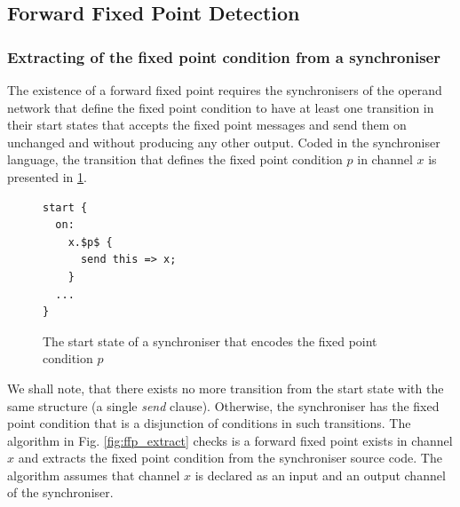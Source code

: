     \subsection{Forward Fixed Point Detection}
    \subsubsection{Extracting of the fixed point condition from a synchroniser}
The existence of a forward fixed point requires the synchronisers of the operand network that define the fixed point condition to have at least one transition in their start states that accepts the fixed point messages and send them on unchanged and without producing any other output. Coded in the synchroniser language, the transition that defines the fixed point condition $p$ in channel $x$ is presented in \ref{ffp:synch_fp}.

\begin{figure}[h!]
\begin{lstlisting}[frame=single,mathescape]
start {
  on:
    x.$p$ {
      send this => x;
    }
  ...
}
\end{lstlisting}
\caption{The start state of a synchroniser that encodes the fixed point condition $p$}
\label{ffp:synch_fp}
\end{figure}

We shall note, that there exists no more transition from the start state with the same structure (a single \emph{send} clause). Otherwise, the synchroniser has the fixed point condition that is a disjunction of conditions in such transitions. The algorithm in Fig. \ref{fig:ffp_extract} checks is a forward fixed point exists in channel $x$ and extracts the fixed point condition from the synchroniser source code. The algorithm assumes that channel $x$ is declared as an input and an output channel of the synchroniser.


